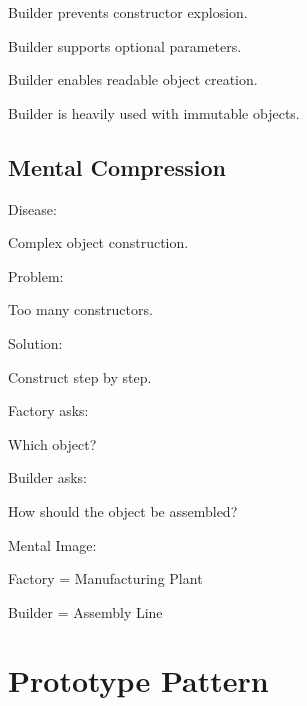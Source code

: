 \documentclass[11pt,a4paper]{book}
\begin{document}
\begin{rosettarule}

Builder prevents constructor explosion.

\end{rosettarule}

\begin{rosettarule}

Builder supports optional parameters.

\end{rosettarule}

\begin{rosettarule}

Builder enables readable object creation.

\end{rosettarule}

\begin{rosettarule}

Builder is heavily used with immutable objects.

\end{rosettarule}


\section{Mental Compression}

\begin{compressionbox}

Disease:

Complex object construction.

Problem:

Too many constructors.

Solution:

Construct step by step.

Factory asks:

Which object?

Builder asks:

How should the object be assembled?

Mental Image:

Factory = Manufacturing Plant

Builder = Assembly Line

\end{compressionbox}
\chapter{Prototype Pattern}
\end{document}
